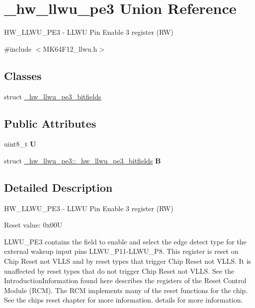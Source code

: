 \hypertarget{union__hw__llwu__pe3}{}\section{\+\_\+hw\+\_\+llwu\+\_\+pe3 Union Reference}
\label{union__hw__llwu__pe3}


H\+W\+\_\+\+L\+L\+W\+U\+\_\+\+P\+E3 -\/ L\+L\+WU Pin Enable 3 register (RW)  




{\ttfamily \#include $<$M\+K64\+F12\+\_\+llwu.\+h$>$}

\subsection*{Classes}
\begin{DoxyCompactItemize}
\item 
struct \hyperlink{struct__hw__llwu__pe3_1_1__hw__llwu__pe3__bitfields}{\+\_\+hw\+\_\+llwu\+\_\+pe3\+\_\+bitfields}
\end{DoxyCompactItemize}
\subsection*{Public Attributes}
\begin{DoxyCompactItemize}
\item 
uint8\+\_\+t {\bfseries U}\hypertarget{union__hw__llwu__pe3_a727cd27b0ef9d7ffb14f272ef6d5fd6b}{}\label{union__hw__llwu__pe3_a727cd27b0ef9d7ffb14f272ef6d5fd6b}

\item 
struct \hyperlink{struct__hw__llwu__pe3_1_1__hw__llwu__pe3__bitfields}{\+\_\+hw\+\_\+llwu\+\_\+pe3\+::\+\_\+hw\+\_\+llwu\+\_\+pe3\+\_\+bitfields} {\bfseries B}\hypertarget{union__hw__llwu__pe3_a47128e9dd0f5b8150300a83f7ce4572c}{}\label{union__hw__llwu__pe3_a47128e9dd0f5b8150300a83f7ce4572c}

\end{DoxyCompactItemize}


\subsection{Detailed Description}
H\+W\+\_\+\+L\+L\+W\+U\+\_\+\+P\+E3 -\/ L\+L\+WU Pin Enable 3 register (RW) 

Reset value\+: 0x00U

L\+L\+W\+U\+\_\+\+P\+E3 contains the field to enable and select the edge detect type for the external wakeup input pins L\+L\+W\+U\+\_\+\+P11-\/\+L\+L\+W\+U\+\_\+\+P8. This register is reset on Chip Reset not V\+L\+LS and by reset types that trigger Chip Reset not V\+L\+LS. It is unaffected by reset types that do not trigger Chip Reset not V\+L\+LS. See the Introduction\+Information found here describes the registers of the Reset Control Module (R\+CM). The R\+CM implements many of the reset functions for the chip. See the chip\textquotesingle{}s reset chapter for more information. details for more information. 

